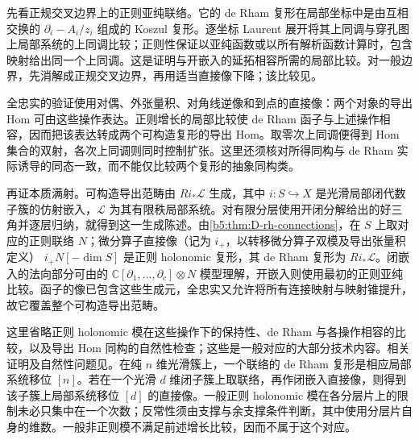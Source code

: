 \begin{proofsketch}
	先看正规交叉边界上的正则亚纯联络。它的 de Rham 复形在局部坐标中是由互相交换的 \(\partial_i-A_i/z_i\) 组成的 Koszul 复形。逐坐标 Laurent 展开将其上同调与穿孔图上局部系统的上同调比较；正则性保证以亚纯函数或以所有解析函数计算时，包含映射给出同一个上同调。这是证明与开嵌入的延拓相容所需的局部比较。对一般边界，先消解成正规交叉边界，再用适当直接像下降；该比较见\cite[Theorem 5.2.24 and Remark 5.2.25, pp. 151--153]{HottaTakeuchiTanisaki2008DModules}。

	全忠实的验证使用对偶、外张量积、对角线逆像和到点的直接像：两个对象的导出 Hom 可由这些操作表达。正则增长的局部比较使 de Rham 函子与上述操作相容，因而把该表达转成两个可构造复形的导出 Hom。取零次上同调便得到 Hom 集合的双射，各次上同调则同时控制扩张。这里还须核对所得同构与 de Rham 实际诱导的同态一致，而不能仅比较两个复形的抽象同构类。

	再证本质满射。可构造导出范畴由 \(Ri_*\mathcal L\) 生成，其中 \(i:S\hookrightarrow X\) 是光滑局部闭代数子簇的仿射嵌入，\(\mathcal L\) 为其有限秩局部系统。对有限分层使用开闭分解给出的好三角并逐层归纳，就得到这一生成陈述。由\cref{b5:thm:D-rh-connections}，在 \(S\) 上取对应的正则联络 \(N\)；微分算子直接像（记为 \(i_+\)，以转移微分算子双模及导出张量积定义） \(i_+N[-\dim S]\) 是正则 holonomic 复形，其 de Rham 复形为 \(Ri_*\mathcal L\)。闭嵌入的法向部分可由的 \(\mathbb C[\partial_1,\ldots,\partial_c]\otimes N\) 模型理解，开嵌入则使用最初的正则亚纯比较。函子的像已包含这些生成元，全忠实又允许将所有连接映射与映射锥提升，故它覆盖整个可构造导出范畴。

	这里省略正则 holonomic 模在这些操作下的保持性、de Rham 与各操作相容的比较，以及导出 Hom 同构的自然性检查；这些是一般对应的大部分技术内容。相关证明及自然性问题见\cite[Sections 7.1--7.2, Theorems 7.2.2 and 7.2.5, Remark 7.2.3, pp. 174--177]{HottaTakeuchiTanisaki2008DModules}。在纯 \(n\) 维光滑簇上，一个联络的 de Rham 复形是相应局部系统移位 \([n]\)。若在一个光滑 \(d\) 维闭子簇上取联络，再作闭嵌入直接像，则得到该子簇上局部系统移位 \([d]\) 的直接像。一般正则 holonomic 模在各分层片上的限制未必只集中在一个次数；反常性须由支撑与余支撑条件判断，其中使用分层片自身的维数。一般非正则模不满足前述增长比较，因而不属于这个对应。
\end{proofsketch}

